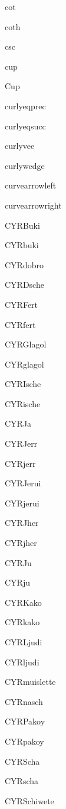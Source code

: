 \documentclass{article}
\begin{document}
cot    \cot{}

coth    \coth{}

csc    \csc{}

cup    \cup{}

Cup    \Cup{}

curlyeqprec    \curlyeqprec{}

curlyeqsucc    \curlyeqsucc{}

curlyvee    \curlyvee{}

curlywedge    \curlywedge{}

curvearrowleft    \curvearrowleft{}

curvearrowright    \curvearrowright{}

CYRBuki    \CYRBuki{}

CYRbuki    \CYRbuki{}

CYRdobro    \CYRdobro{}

CYRDsche    \CYRDsche{}

CYRFert    \CYRFert{}

CYRfert    \CYRfert{}

CYRGlagol    \CYRGlagol{}

CYRglagol    \CYRglagol{}

CYRIsche    \CYRIsche{}

CYRische    \CYRische{}

CYRJa    \CYRJa{}

CYRJerr    \CYRJerr{}

CYRjerr    \CYRjerr{}

CYRJerui    \CYRJerui{}

CYRjerui    \CYRjerui{}

CYRJher    \CYRJher{}

CYRjher    \CYRjher{}

CYRJu    \CYRJu{}

CYRju    \CYRju{}

CYRKako    \CYRKako{}

CYRkako    \CYRkako{}

CYRLjudi    \CYRLjudi{}

CYRljudi    \CYRljudi{}

CYRmuislette    \CYRmuislette{}

CYRnasch    \CYRnasch{}

CYRPakoy    \CYRPakoy{}

CYRpakoy    \CYRpakoy{}

CYRScha    \CYRScha{}

CYRscha    \CYRscha{}

CYRSchiwete    \CYRSchiwete{}
\end{document}
